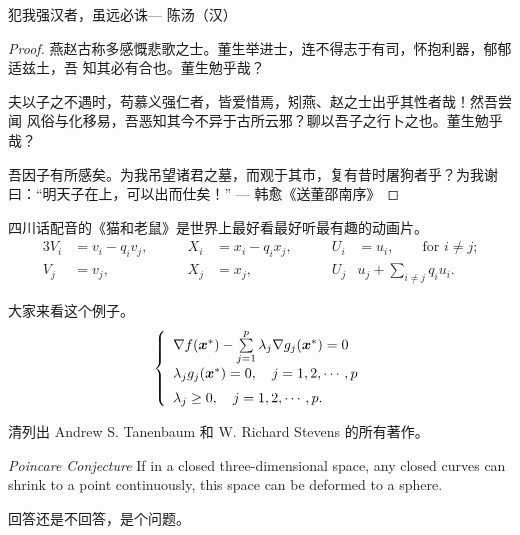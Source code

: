 \begin{theorem}
    \label{thm-theorem-example}
    犯我强汉者，虽远必诛\hfill --- 陈汤（汉）
\end{theorem}

\begin{proof}
    \label{thm-proof-example}
    燕赵古称多感慨悲歌之士。董生举进士，连不得志于有司，怀抱利器，郁郁适兹土，吾
    知其必有合也。董生勉乎哉？

    夫以子之不遇时，苟慕义强仁者，皆爱惜焉，矧燕、赵之士出乎其性者哉！然吾尝闻
    风俗与化移易，吾恶知其今不异于古所云邪？聊以吾子之行卜之也。董生勉乎哉？

    吾因子有所感矣。为我吊望诸君之墓，而观于其市，复有昔时屠狗者乎？为我谢
    曰：“明天子在上，可以出而仕矣！” \hfill --- 韩愈《送董邵南序》
\end{proof}

\begin{corollary}
    \label{thm-corollary-example}
    四川话配音的《猫和老鼠》是世界上最好看最好听最有趣的动画片。
    \begin{alignat}{3}
        V_i & =v_i - q_i v_j, & \qquad X_i & = x_i - q_i x_j, &
        \qquad U_i & = u_i, \qquad \text{for $i\ne j$;} \\
        V_j & = v_j,          & \qquad X_j & = x_j, &
        \qquad U_j & u_j + \sum_{i\ne j} q_i u_i.
    \end{alignat}
\end{corollary}

\begin{example}
    \label{thm-example-example}
    大家来看这个例子。
    \begin{equation}
        \left\{
        \begin{array}{l}
            \nabla f({\mbox{\boldmath $x$}}^*)-
                \sum\limits_{j=1}^p\lambda_j\nabla g_j
                ({\mbox{\boldmath $x$}}^*)=0 \\ [0.3cm]
            \lambda_jg_j({\mbox{\boldmath $x$}}^*)=0,
                \quad j=1,2,\cdots,p \\ [0.2cm]
            \lambda_j\ge 0,\quad j=1,2,\cdots,p.
        \end{array}
        \right.
    \end{equation}
\end{example}

\begin{exercise}
    \label{thm-exercise-example}
    清列出 Andrew S. Tanenbaum 和 W. Richard Stevens 的所有著作。
\end{exercise}

\begin{conjecture}
    \label{thm-conjecture-example}
    \textit{Poincare Conjecture} If in a closed three-dimensional space,
    any closed curves can shrink to a point continuously,
    this space can be deformed to a sphere.
\end{conjecture}

\begin{problem}
    \label{thm-problem-example}
    回答还是不回答，是个问题。
\end{problem}
